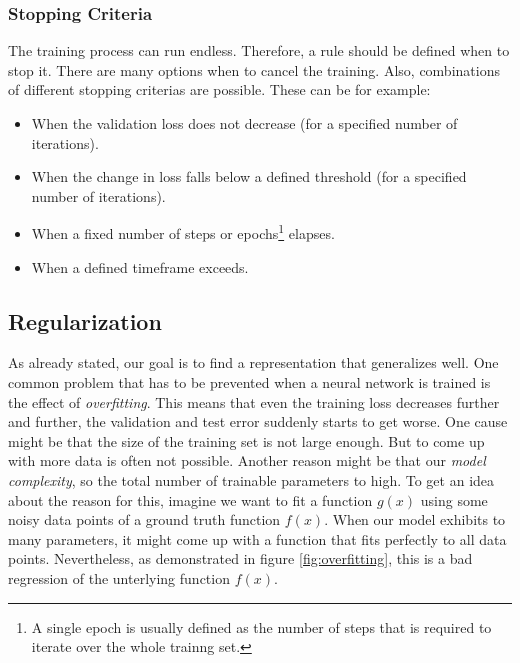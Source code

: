 \subsubsection{Stopping Criteria}

The training process can run endless. Therefore, a rule should be defined when to stop it. There are many options when to cancel the training. Also, combinations of different stopping criterias are possible. These can be for example:

\begin{itemize}
\item When the validation loss does not decrease (for a specified number of iterations).
\item When the change in loss falls below a defined threshold (for a specified number of iterations).
\item When a fixed number of steps or epochs\footnote{A single epoch is usually defined as the number of steps that is required to iterate over the whole trainng set.} elapses.
\item When a defined timeframe exceeds.
\end{itemize}


\subsection{Regularization}

As already stated, our goal is to find a representation that generalizes well. One common problem that has to be prevented when a neural network is trained is the effect of \textit{overfitting}. This means that even the training loss decreases further and further, the validation and test error suddenly starts to get worse. One cause might be that the size of the training set is not large enough. But to come up with more data is often not possible. Another reason might be that our \textit{model complexity}, so the total number of trainable parameters to high. To get an idea about the reason for this, imagine we want to fit a function $g(x)$ using some noisy data points of a ground truth function $f(x)$. When our model exhibits to many parameters, it might come up with a function that fits perfectly to all data points. Nevertheless, as demonstrated in figure \ref{fig:overfitting}, this is a bad regression of the unterlying function $f(x)$.

